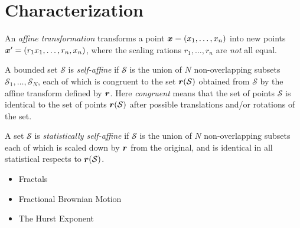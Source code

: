 \chapter{Characterization}

An \emph{affine transformation} transforms a point $\boldsymbol{x} = (x_1, \dots, x_n)$ into new points $\boldsymbol{x}' = (r_1x_1, \dots, r_n, x_n)$, where the scaling rations $r_1, \dots, r_n$ are \emph{not} all equal.

A bounded set $\mathcal{S}$ is \emph{self-affine} if $\mathcal{S}$ is the union of $N$ non-overlapping subsets $\mathcal{S}_1, \dots, \mathcal{S}_N$, each of which is congruent to the set $\boldsymbol{r}(\mathcal{S})$ obtained from $\mathcal S$ by the affine transform defined by $\boldsymbol{r}$. Here \emph{congruent} means that the set of points $\mathcal{S}$ is identical to the set of points $\boldsymbol{r}(\mathcal{S})$ after possible translations and/or rotations of the set\cite{feder1988fractals}.

A set $\mathcal{S}$ is \emph{statistically self-affine} if $\mathcal{S}$ is the union of $N$ non-overlapping subsets each of which is scaled down by $\boldsymbol{r}$ from the original, and is identical in all statistical respects to $\boldsymbol{r}(\mathcal{S})$.

\begin{itemize}
    \item Fractals
    \item Fractional Brownian Motion
    \item The Hurst Exponent
\end{itemize}
